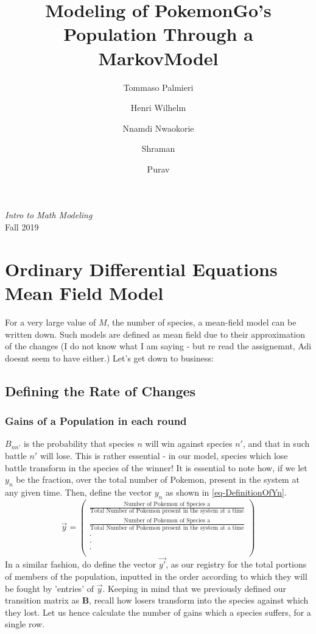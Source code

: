 \documentclass[border=1pt]{article}
\title{Modeling of PokemonGo's Population Through a MarkovModel}
\author[1]{Tommaso Palmieri}
\affil[1]{\footnotesize NetID: tp1438, Email: Tommaso.Palmieri@NYU.edu}
\author[2]{Henri Wilhelm}
\affil[2]{Email: hpv234@nyu.edu}
\author[3]{Nnamdi Nwaokorie}
\author[4]{Shraman}
\author[5]{Purav}
\begin{document}
\maketitle

\begin{center} %
	\textit{Intro to Math Modeling}\\
	Fall 2019
\end{center}

\section{Ordinary Differential Equations Mean Field Model}
For a very large value of $M$, the number of species, a mean-field model can be written down. Such models are defined as mean field due to their approximation of the changes (I do not know what I am saying - but re read the assignemnt, Adi doesnt seem to have either.) Let's get down to business:

\subsection{Defining the Rate of Changes}
\subsubsection*{Gains of a Population in each round}
	$B_{nn'}$ is the probability that species $n$ will win against species $n'$, and that in such battle $n'$ will lose. This is rather essential - in our model, species which lose battle transform in the species of the winner! It is essential to note how, if we let $y_n$ be the fraction, over the total number of Pokemon, present in the system at any given time. Then, define the vector $y_n$ as shown in \autoref{eq-DefinitionOfYn}. 
	\begin{equation}
	\label{eq-DefinitionOfYn}
	\vec{y}=
		\begin{pmatrix}
			\frac{\text{Number of Pokemon of Species a}}{\text{Total Number of Pokemon present in the system at a time}}\\
			\frac{\text{Number of Pokemon of Species a}}{\text{Total Number of Pokemon present in the system at a time}}\\
			\cdot\\
			\cdot\\
			\cdot\\
		\end{pmatrix}
	\end{equation}
	In a similar fashion, do define the vector $\vec{y'}$, as our registry for the total portions of members of the population, inputted in the order according to which they will be fought by 'entries' of $\vec{y}$. Keeping in mind that we previously defined our transition matrix as $\mathbf{B}$, recall how losers transform into the species against which they lost. Let us hence calculate the number of gains which a species suffers, for a single row. 
	
\end{document}
